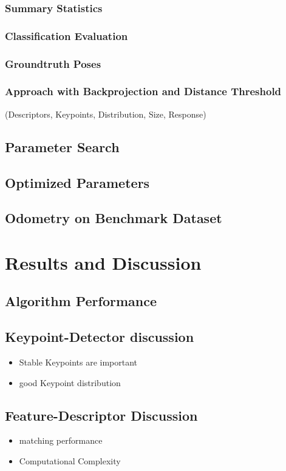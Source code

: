 \subsubsection{Summary Statistics}
\subsubsection{Classification Evaluation}
\subsubsection{Groundtruth Poses}
\subsubsection{Approach with Backprojection and Distance Threshold}

(Descriptors, Keypoints, Distribution, Size, Response)

\subsection{Parameter Search}
\subsection{Optimized Parameters}

\subsection{Odometry on Benchmark Dataset}

\section{Results and Discussion}
\subsection{Algorithm Performance}
\subsection{Keypoint-Detector discussion}

\begin{itemize}
    \item Stable Keypoints are important
    \item good Keypoint distribution
\end{itemize}

\subsection{Feature-Descriptor Discussion}
\begin{itemize}
    \item matching performance
    \item Computational Complexity
\end{itemize}

